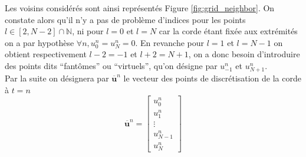 \documentclass[a4,12pt]{article}
\newcommand{\N}{\mathbb{N}}
\newcommand{\ub}{\mathbf{u}}
\begin{document}
Les voisins considérés sont ainsi représentés Figure \ref{fig:grid_neighbor}. On constate alors qu'il n'y a pas de problème d'indices pour les points $l\in [2,N-2]\cap \N$, ni pour $l=0$ et $l=N$ car la corde étant fixée aux extrémités on a par hypothèse $\forall n, u_0^n=u_N^n=0$. En revanche pour $l=1$ et $l=N-1$ on obtient respectivement $l-2=-1$ et $l+2=N+1$, on a donc besoin d'introduire des points dits \enquote{fantômes} ou \enquote{virtuels}, qu'on désigne par $u_{-1}^n$ et $u_{N+1}^n$.\\

Par la suite on désignera par $\overline{\ub}^n$ le vecteur des points de discrétisation de la corde à $t=n$ 
\[
\overline{\ub}^n=\begin{bmatrix}u_0^n\\ u_1^n\\ \vdots \\ u_{N-1}^n \\ u_N^n\end{bmatrix}
\]

\end{document}
